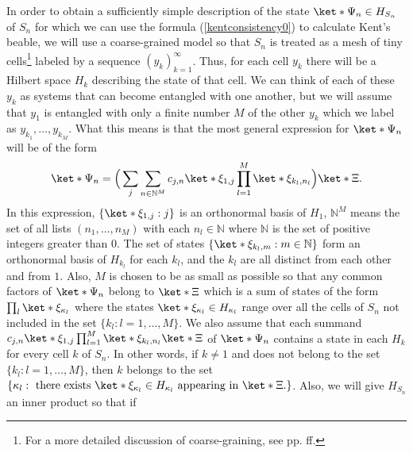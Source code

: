 \documentclass[12pt]{report}
\providecommand{\DIFaddbegin}{} %
\providecommand{\DIFaddend}{} %
\providecommand{\DIFdelbegin}{} %
\providecommand{\DIFdelend}{} %
\begin{document}
In order to obtain a sufficiently simple description of the state $\ket*{\Psi_n}\in H_{S_n}$ of $S_n$ for which we can use the formula (\ref{kentconsistency0}) to calculate Kent's beable, we will  
use a coarse-grained model so that $S_n$ is treated as a mesh of tiny cells\footnote{For a more detailed discussion of coarse-graining, see pp. \pageref{meshref} ff.} labeled by a sequence $(y_k)_{k=1}^\infty$. %
 Thus, for each cell $y_k$ there will be a Hilbert space $H_k$  %
 \DIFdelbegin %
\DIFdelend \DIFaddbegin {}\DIFaddend %
 describing the state of that cell. We can think of each of these $y_k$ as systems that can become entangled with one another, but we will assume that $y_1$ is entangled with only a finite number $M$ of the other $y_k$ which we label as $y_{k_1}, \ldots, y_{k_M}$. %
  What this means is that the most general expression for $\ket*{\Psi_n}$ will be of the form
\begin{equation}\label{Sistate}
\ket*{\Psi_n}=\Big(\sum_j\sum_{n\in\mathbb{N}^M} c_{j,n}\ket*{\xi_{1,j}}\prod_{l=1}^{M}\ket*{\xi_{k_{l},n_l}}\Big)\ket*{\Xi}.
\end{equation}
In this expression, $\{\ket*{\xi_{1,j}}:j\}$ %
%
 is an orthonormal basis of $H_1$, $\mathbb{N}^M$ means the set of all lists $(n_1,\ldots,n_M)$ with each $n_l\in\mathbb{N}$ where $\mathbb{N}$
\DIFdelbegin %
\DIFdelend is the set of positive integers greater than 0. The set of states $\{\ket*{\xi_{k_{l},m}}:m\in\mathbb{N}\}$ form an orthonormal basis of $H_{k_{l}}$ for each $k_l$, and the $k_{l}$ are all distinct from each other and from $1$. Also, $M$ is chosen to be as small as possible so that any common factors of $\ket*{\Psi_n}$ belong to $\ket*{\Xi}$ which is a sum of states of the form $\prod_l\ket*{\xi_{\kappa_l}}$ where the states $\ket*{\xi_{\kappa_l}}\in H_{\kappa_l}$ range over all the cells of $S_n$ not included in the set $\{k_{l}:l=1,\ldots,M\}.$ We also assume that each summand $c_{j,n}\ket*{\xi_{1,j}}\prod_{l=1}^{M}\ket*{\xi_{k_{l},n_l}}\ket*{\Xi}$ of $\ket*{\Psi_n}$ contains a state in each $H_k$ for every cell $k$ of $S_n$. In other words, if $k\neq 1$ and does not belong to the set $\{k_{l}:l=1,\ldots,M\}$, then $k$ belongs to the set $\{\kappa_l:\text{ there exists }\ket*{\xi_{\kappa_l}}\in H_{\kappa_l}\text{ appearing in }\ket*{\Xi}.\}$. Also, we will give $H_{S_n}$ an inner product so that if 
\end{document}
